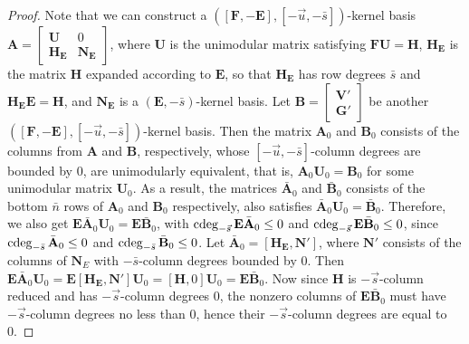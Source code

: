 \begin{proof}
Note that we can construct a $\left(\left[\mathbf{F},-\mathbf{E}\right],\left[-\vec{u},-\bar{s}\right]\right)$-kernel
basis $\mathbf{A}=\begin{bmatrix}\mathbf{U} & 0\\
\mathbf{H}_{\mathbf{E}} & \mathbf{N}_{\mathbf{E}}
\end{bmatrix}$, where $\mathbf{U}$ is the unimodular matrix satisfying $\mathbf{F}\mathbf{U}=\mathbf{H}$,
$\mathbf{H}_{\mathbf{E}}$ is the matrix $\mathbf{H}$ expanded according
to $\mathbf{E}$, so that $\mathbf{H}_{\mathbf{E}}$ has row degrees
$\bar{s}$ and $\mathbf{H}_{\mathbf{E}}\mathbf{E}=\mathbf{H}$, and
$\mathbf{N}_{\mathbf{E}}$ is a $\left(\mathbf{E},-\bar{s}\right)$-kernel
basis. Let $\mathbf{B}=\begin{bmatrix}\mathbf{V}'\\
\mathbf{G}'
\end{bmatrix}$ be another $\left(\left[\mathbf{F},-\mathbf{E}\right],\left[-\vec{u},-\bar{s}\right]\right)$-kernel
basis. Then the matrix $\mathbf{A}_{0}$ and $\mathbf{B}_{0}$ consists
of the columns from $\mathbf{A}$ and $\mathbf{B}$, respectively,
whose $\left[-\vec{u},-\bar{s}\right]$-column degrees are bounded
by $0$, are unimodularly equivalent, that is, $\mathbf{A}_{0}\mathbf{U}_{0}=\mathbf{B}_{0}$
for some unimodular matrix $\mathbf{U}_{0}$. As a result, the matrices
$\bar{\mathbf{A}}_{0}$ and $\bar{\mathbf{B}}_{0}$ consists of the
bottom $\bar{n}$ rows of $\mathbf{A}_{0}$ and $\mathbf{B}_{0}$
respectively, also satisfies $\bar{\mathbf{A}}_{0}\mathbf{U}_{0}=\bar{\mathbf{B}}_{0}$.
Therefore, we also get $\mathbf{E}\bar{\mathbf{A}}_{0}\mathbf{U}_{0}=\mathbf{E}\bar{\mathbf{B}}_{0}$,
with $\cdeg_{-\vec{s}}\mathbf{E}\bar{\mathbf{A}}_{0}\le0$ and $\cdeg_{-\vec{s}}\mathbf{E}\bar{\mathbf{B}}_{0}\le0$,
since $\cdeg_{-\bar{s}}\bar{\mathbf{A}}_{0}\le0$ and $\cdeg_{-\bar{s}}\bar{\mathbf{B}}_{0}\le0$.
Let $\bar{\mathbf{A}}_{0}=\left[\mathbf{H}_{\mathbf{E}},\mathbf{N}'\right]$,
where $\mathbf{N}'$ consists of the columns of $\mathbf{N}_{E}$
with $-\bar{s}$-column degrees bounded by 0. Then $\mathbf{E}\bar{\mathbf{A}}_{0}\mathbf{U}_{0}=\mathbf{E}\left[\mathbf{H}_{\mathbf{E}},\mathbf{N}'\right]\mathbf{U}_{0}=\left[\mathbf{H},0\right]\mathbf{U}_{0}=\mathbf{E}\bar{\mathbf{B}}_{0}$.
Now since $\mathbf{H}$ is $-\vec{s}$-column reduced and has $-\vec{s}$-column
degrees $0$, the nonzero columns of $\mathbf{E}\bar{\mathbf{B}}_{0}$
must have $-\vec{s}$-column degrees no less than $0$, hence their
$-\vec{s}$-column degrees are equal to 0.
\end{proof}
